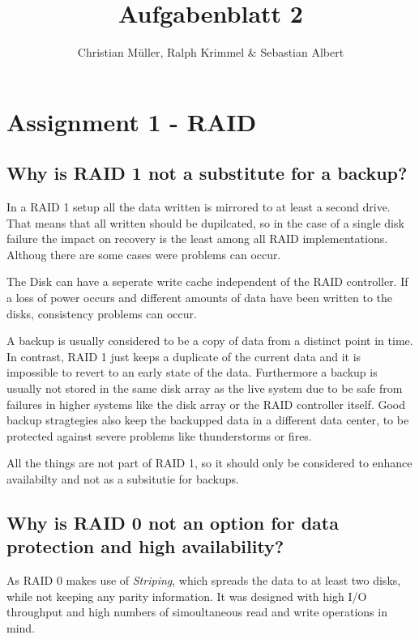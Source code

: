 \documentclass{article}
\begin{document}
\title{Aufgabenblatt 2}
\author{Christian Müller, Ralph Krimmel \& Sebastian Albert }
\maketitle

\section*{Assignment 1 - RAID}

\subsection{Why is RAID 1 not a substitute for a backup?}
	In a RAID 1 setup all the data written is mirrored to at least a second drive.
	That means that all written should be dupilcated,
	so in the case of a single disk failure the impact on recovery is the least among all RAID implementations.
	Althoug there are some cases were problems can occur.

	The Disk can have a seperate write cache independent of the RAID controller.
	If a loss of power occurs and different amounts of data have been written to the disks,
	consistency problems can occur.

	A backup is usually considered to be a copy of data from a distinct point in time.
	In contrast,
	RAID 1 just keeps a duplicate of the current data 
	and it is impossible to revert to an early state of the data.
	Furthermore a backup is usually not stored in the same disk array	as the live system
	due to be safe from failures in higher systems like the disk array or the RAID controller itself.
	Good backup stragtegies also keep the backupped data in a different data center,
	to be protected against severe problems like thunderstorms or fires.

	All the things are not part of RAID 1,
	so it should only be considered to enhance availabilty
	and not as a subsitutie for backups.

\subsection{Why is RAID 0 not an option for data protection and high availability?}
	As RAID 0 makes use of \emph{Striping},
	which spreads the data to at least two disks,
	while not keeping any parity information.
	It was designed with high I/O throughput
	and high numbers of simoultaneous read and write operations in mind.
\end{document}
